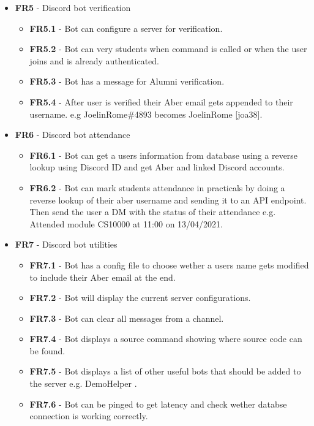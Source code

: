 \begin{itemize}
	\item \textbf{FR5} - Discord bot verification
	\begin{itemize}
		\item \textbf{FR5.1} - Bot can configure a server for verification.
		\item \textbf{FR5.2} - Bot can very students when command is called or when the user joins and is already authenticated.
		\item \textbf{FR5.3} - Bot has a message for Alumni verification.
		\item \textbf{FR5.4} - After user is verified their Aber email gets appended to their username. e.g JoelinRome\#4893 becomes JoelinRome [joa38].
	\end{itemize}

	\item \textbf{FR6} - Discord bot attendance
	\begin{itemize}
		\item \textbf{FR6.1} - Bot can get a users information from database using a reverse lookup using Discord ID and get Aber and linked Discord accounts.
		\item \textbf{FR6.2} - Bot can mark students attendance in practicals by doing a reverse lookup of their aber username and sending it to an API endpoint. Then send the user a DM with the status of their attendance e.g. Attended module CS10000 at 11:00 on 13/04/2021.
	\end{itemize}

	\item \textbf{FR7} - Discord bot utilities
	\begin{itemize}
		\item \textbf{FR7.1} - Bot has a config file to choose wether a users name gets modified to include their Aber email at the end.
		\item \textbf{FR7.2} - Bot will display the current server configurations.
		\item \textbf{FR7.3} - Bot can clear all messages from a channel.
		\item \textbf{FR7.4} - Bot displays a source command showing where source code can be found.
		\item \textbf{FR7.5} - Bot displays a list of other useful bots that should be added to the server e.g. DemoHelper \cite{demohelper}.
		\item \textbf{FR7.6} - Bot can be pinged to get latency and check wether databse connection is working correctly.
	\end{itemize}


\end{itemize}
